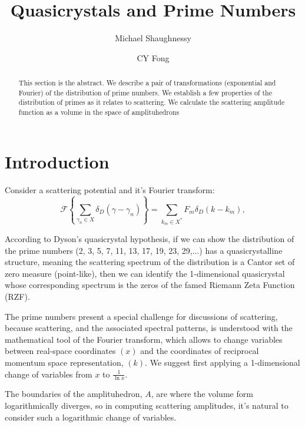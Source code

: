 \documentclass[aps,prb,twocolumn,superscriptaddress]{revtex4}
\begin{document}
\title{Quasicrystals and Prime Numbers}

\author{Michael Shaughnessy}
\author{CY Fong}

\begin{abstract}
This section is the abstract. We describe a pair of transformations (exponential and Fourier) of the distribution of prime numbers. We establish a few properties of the distribution of primes as it relates to scattering. We calculate the scattering amplitude function as a volume in the space of amplituhedrons  
\end{abstract}

\maketitle

\section{Introduction}
Consider a scattering potential and it's Fourier transform:
\begin{equation}
 \label{eq: RiemannFourier}
 \mathcal{F}\left \{ \sum_{\gamma_n \in X}\delta_D(\gamma - \gamma_n) \right \} = \sum_{k_m \in X^{*}} F_{m} \delta_D(k - k_{m}),
\end{equation}


According to Dyson's quasicrystal hypothesis, if we can show the distribution of the prime numbers (2, 3, 5, 7, 11, 13, 17, 19, 23, 29,...) has a quasicrystalline structure, meaning the scattering spectrum of the distribution is a Cantor set of zero measure (point-like), then we can identify the 1-dimensional quasicrystal whose corresponding spectrum is the zeros of the famed Riemann Zeta Function (RZF). 

The prime numbers present a special challenge for discussions of scattering, because scattering, and the associated spectral patterns, is understood with the mathematical tool of the Fourier transform, which allows to change variables between real-space coordinates $(x)$ and the coordinates of reciprocal momentum space representation, $(k)$. We suggest first applying a 1-dimensional change of variables from $x$ to $\frac{1}{\ln{x}}$. 



The boundaries of the amplituhedron, $A$, are where the volume form logarithmically diverges, so in computing scattering amplitudes, it's natural to consider such a logarithmic change of variables. 
\end{document}
